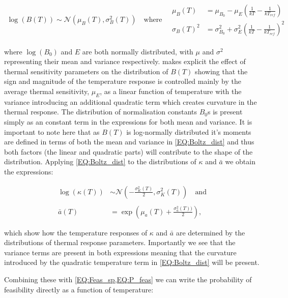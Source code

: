 \documentclass{article}
\begin{document}
\begin{align} \label{EQ:Boltz_dist}
    \log(B(T)) \sim \mathcal{N}\left(\mu_{B}(T) , \sigma_{B}^2(T) \right) 
    \quad \text{where} \quad
    \begin{array}{cc}
        \mu_B(T) &= \mu_{B_0} - \mu_{E} \left(\frac{1}{kT} - \frac{1}{k T_{ref} }\right)  \\
        \sigma_{B}(T)^2 &= \sigma_{B_0}^2 + \sigma_{E}^2 \left(\frac{1}{kT} - \frac{1}{k T_{ref} }\right)^2
    \end{array}
\end{align}

where $\log(B_0)$ and $E$ are both normally distributed, with $\mu$ and $\sigma^2$ representing their mean and variance respectively.  makes explicit the effect of thermal sensitivity parameters on the distribution of $B(T)$ showing that the sign and magnitude of the temperature response is controlled mainly by the average thermal sensitivity, $\mu_E$, as a linear function of temperature with the variance introducing an additional quadratic term which creates curvature in the thermal response. The distribution of normalisation constants $B_0$s is present simply as an constant term in the expressions for both mean and variance. It is important to note here that as $B(T)$ is log-normally distributed it's moments are defined in terms of both the mean and variance in \cref{EQ:Boltz_dist} and thus both factors (the linear and quadratic parts) will contribute to the shape of the distribution. Applying \cref{EQ:Boltz_dist} to the distributions of $\kappa$ and $\bar{a}$ we obtain the expressions:

\begin{align} \label{EQ:Trait_distributions}
        \log(\kappa(T)) &\sim \mathcal{N}\left( -\frac{\sigma_{K}^2(T)}{2} , \sigma_{K}^2(T) \right) \quad \text{and} \\ \nonumber \\
        \bar{a}(T) &= \exp \left(\mu_a(T) + \frac{\sigma_a^2(T))}{2} \right),
\end{align}

which show how the temperature responses of $\kappa$ and $\bar{a}$ are determined by the distributions of thermal response parameters. Importantly we see that the variance terms are present in both expressions meaning that the curvature introduced by the quadratic temperature term in \cref{EQ:Boltz_dist} will be present. 

Combining these with \cref{EQ:Feas_sp,EQ:P_feas} we can write the probability of feasibility directly as a function of temperature:
\end{document}
